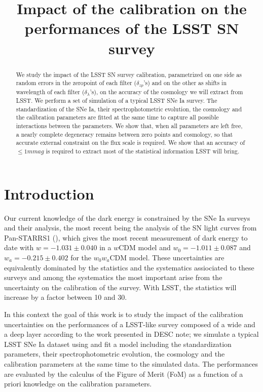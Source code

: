 \documentclass[\docopts]{\docclass}
\begin{document}
\title{ Impact of the calibration on the performances of the LSST SN survey }

\maketitlepre

\begin{abstract}
We study the impact of the LSST SN survey calibration, parametrized on one side as random errors in the zeropoint of each filter ($\delta_{zp}$'s) and on the other as shifts in wavelength of each filter ($\delta_\lambda$'s), on the accuracy of the cosmology we will extract from LSST.
We perform a set of simulation of a typical LSST SNe Ia survey.
The standardization of the SNe Ia, their spectrophotometric evolution, the cosmology and the calibration parameters are fitted at the same time to capture all possible interactions between the parameters.
We show that, when all parameters are left free, a nearly complete degeneracy remains between zero points and cosmology, so that accurate external constraint on the flux scale is required. We show that an accuracy of $\leqslant 1mmag$ is required to extract most of the statistical information LSST will bring.
\end{abstract}


\maketitlepost

% 

\section{Introduction}
\label{sec:intro}

Our current knowledge of the dark energy is constrained by the SNe Ia surveys and their analysis, the most recent being the analysis of the SN light curves from Pan-STARRS1 (\cite{1710.00845}), which gives the most recent measurement of dark energy to date with $w = -1.031 \pm 0.040$ in a $w\text{CDM}$ model and $w_0 = -1.011 \pm 0.087$ and $w_a = -0.215 \pm 0.402$ for the $w_0w_a\text{CDM}$ model. These uncertainties are equivalently dominated by the statistics and the systematics assiociated to these surveys and among the systematics the most important arise from the uncertainty on the calibration of the survey.
With LSST, the statistics will increase by a factor between 10 and 30.

In this context the goal of this work is to study the impact of the calibration uncertainties on the performances of a LSST-like survey composed of a wide and a deep layer according to the work presented in \cite{SN-CADENCE} DESC note; we simulate a typical LSST SNe Ia dataset using  and fit a model including the standardization parameters, their spectrophotometric evolution, the cosmology and the calibration parameters at the same time to the simulated data. The performances are evaluated by the calculus of the Figure of Merit (FoM) as a function of a priori knowledge on the calibration parameters.
\end{document}
